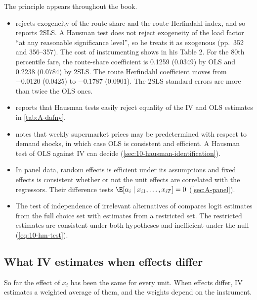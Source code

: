 The principle appears throughout the book.
\begin{itemize}
\item \citet{Borenstein1989} rejects exogeneity of the route share and the route Herfindahl index, and so
  reports 2SLS. A Hausman test does not reject exogeneity of the load factor ``at any reasonable significance
  level'', so he treats it as exogenous (pp.~352 and 356--357). The cost of instrumenting shows in his Table 2.
  For the 80th percentile fare, the route-share coefficient is 0.1259 (0.0349) by OLS and 0.2238 (0.0784) by
  2SLS. The route Herfindahl coefficient moves from $-0.0120$ (0.0425) to $-0.1787$ (0.0901). The 2SLS standard
  errors are more than twice the OLS ones.
\item \citet[p.~21]{Dafny2005} reports that Hausman tests easily reject equality of the IV and OLS estimates
  in \cref{tab:A-dafny}.
\item \citet{Hausman1997} notes that weekly supermarket prices may be predetermined with respect to demand
  shocks, in which case OLS is consistent and efficient. A Hausman test of OLS against IV can decide
  (\cref{sec:10-hausman-identification}).
\item In panel data, random effects is efficient under its assumptions and fixed effects is consistent
  whether or not the unit effects are correlated with the regressors. Their difference tests
  $\E[\alpha_i \mid x_{i1}, \dots, x_{iT}] = 0$ (\cref{sec:A-panel}).
\item The test of independence of irrelevant alternatives of \citet{HausmanMcFadden1984} compares logit
  estimates from the full choice set with estimates from a restricted set. The restricted estimates are
  consistent under both hypotheses and inefficient under the null (\cref{eq:10-hm-test}).
\end{itemize}

\subsection{What IV estimates when effects differ}\label{sec:A-late}

So far the effect of $x_i$ has been the same for every unit. When effects differ, IV estimates a weighted
average of them, and the weights depend on the instrument.

